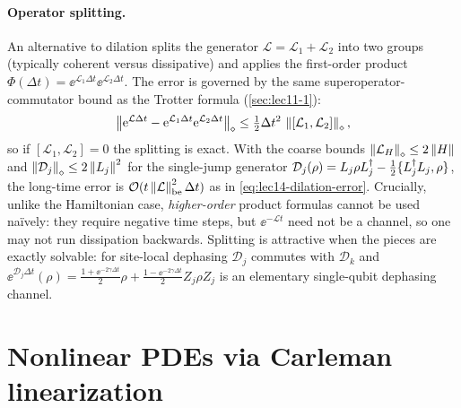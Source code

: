 \paragraph{Operator splitting.}
An alternative to dilation splits the generator $\mathcal L=\mathcal L_1+\mathcal L_2$ into two
groups (typically coherent versus dissipative) and applies the first-order product
$\Phi(\Delta t)=\ee^{\mathcal L_1\Delta t}\ee^{\mathcal L_2\Delta t}$. The error is governed by
the same superoperator-commutator bound as the Trotter formula (\cref{sec:lec11-1}):
\begin{equation}
  \left\lVert \mathrm{e}^{\mathcal L\Delta t}-\mathrm{e}^{\mathcal L_1\Delta t}\mathrm{e}^{\mathcal L_2\Delta t} \right\rVert_\diamond
  \le\tfrac12\Delta t^2\,\left\lVert [\mathcal L_1,\mathcal L_2] \right\rVert_\diamond,
  \label{eq:lec14-split}
\end{equation}
so if $[\mathcal L_1,\mathcal L_2]=0$ the splitting is exact. With the coarse bounds
$\left\lVert \mathcal L_H \right\rVert_\diamond\le2\left\lVert H \right\rVert$ and $\left\lVert \mathcal D_j \right\rVert_\diamond\le2\left\lVert L_j \right\rVert^2$ for
the single-jump generator $\mathcal D_j(\rho)=L_j\rho L_j^{\dagger}-\tfrac12\{L_j^{\dagger} L_j,\rho\}$, the
long-time error is $\mathcal O(t\left\lVert \mathcal L \right\rVert_{\mathrm{be}}^2\Delta t)$ as in
\eqref{eq:lec14-dilation-error}. Crucially, unlike the Hamiltonian case, \emph{higher-order}
product formulas cannot be used na\"ively: they require negative time steps, but $\ee^{-\mathcal L
t}$ need not be a channel, so one may not run dissipation backwards. Splitting is attractive when
the pieces are exactly solvable: for site-local dephasing $\mathcal D_j$ commutes with
$\mathcal D_k$ and $\ee^{\mathcal D_j\Delta t}(\rho)=\tfrac{1+\ee^{-2\gamma\Delta t}}2\rho+
\tfrac{1-\ee^{-2\gamma\Delta t}}2 Z_j\rho Z_j$ is an elementary single-qubit dephasing channel.

\section{Nonlinear PDEs via Carleman linearization}
\label{sec:lec14-4}

